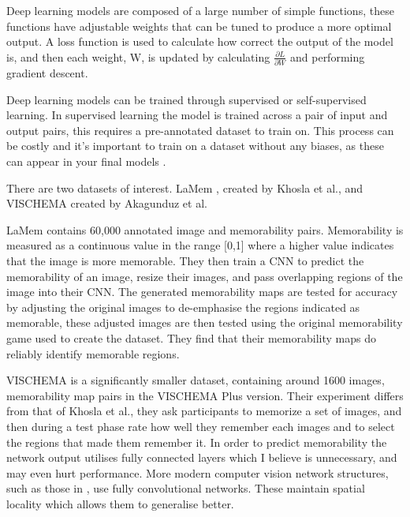 \documentclass{UoYCSproject}
\begin{document}
Deep learning models are composed of a large number of simple functions, these functions have adjustable weights that can be tuned to produce a more optimal output. A loss function is used to calculate how correct the output of the model is, and then each weight, W, is updated by calculating $\frac{\partial L}{\partial W}$ and performing gradient descent.

Deep learning models can be trained through supervised or self-supervised learning. In supervised learning the model is trained across a pair of input and output pairs, this requires a pre-annotated dataset to train on. This process can be costly and it's important to train on a dataset without any biases, as these can appear in your final models \cite{dastin_2018, najibi_2020}.  

There are two datasets of interest. LaMem \cite{ICCV15_Khosla}, created by Khosla et al., and VISCHEMA \cite{VischemaPaper} created by Akagunduz et al. 

LaMem contains 60,000 annotated image and memorability pairs. Memorability is measured as a continuous value in the range [0,1] where a higher value indicates that the image is more memorable. They then train a CNN to predict the memorability of an image, resize their images, and pass overlapping regions of the image into their CNN. The generated memorability maps are tested for accuracy by adjusting the original images to de-emphasise the regions indicated as memorable, these adjusted images are then tested using the original memorability game used to create the dataset. They find that their memorability maps do reliably identify memorable regions.

VISCHEMA is a significantly smaller dataset, containing around 1600 images, memorability map pairs in the VISCHEMA Plus version. Their experiment differs from that of Khosla et al., they ask participants to memorize a set of images, and then during a test phase rate how well they remember each images and to select the regions that made them remember it. In order to predict memorability the network output utilises fully connected layers which I believe is unnecessary, and may even hurt performance. More modern computer vision network structures, such as those in \cite{ronneberger2015unet, goodfellow2014generative, ho2020denoising, isola2018imagetoimage, saharia2022palette}, use fully convolutional networks. These maintain spatial locality which allows them to generalise better.
\end{document}
